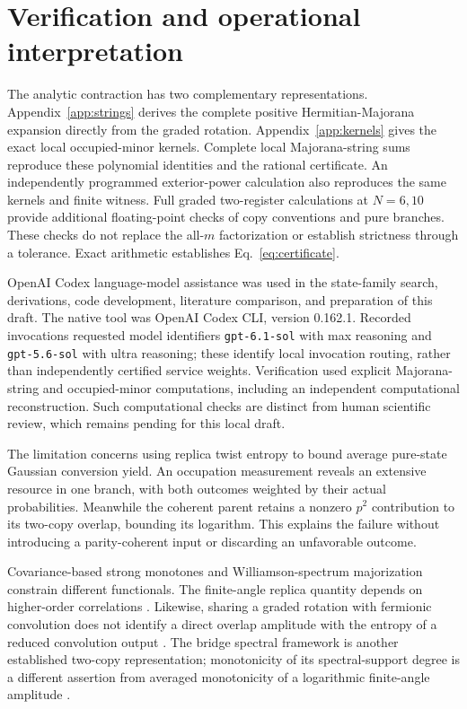 \documentclass[aps,pra,reprint,amsmath,amssymb,longbibliography,floatfix]{revtex4-2}
\begin{document}
\section{Verification and operational interpretation}
\label{sec:discussion}

The analytic contraction has two complementary representations.
Appendix~\ref{app:strings} derives the complete positive
Hermitian-Majorana expansion directly from the graded rotation.
Appendix~\ref{app:kernels} gives the exact local occupied-minor kernels.
Complete local Majorana-string sums reproduce these polynomial
identities and the rational certificate.
An independently programmed exterior-power calculation also
reproduces the same kernels and finite witness. Full graded
two-register calculations at \(N=6,10\) provide additional
floating-point checks of copy conventions and pure branches.
These checks do not replace the all-\(m\) factorization or establish
strictness through a tolerance. Exact arithmetic establishes
Eq.~\eqref{eq:certificate}.

OpenAI Codex language-model assistance was used in the state-family
search, derivations, code development, literature comparison,
and preparation of this draft. The native tool was OpenAI Codex CLI,
version 0.162.1. Recorded invocations requested model identifiers
\texttt{gpt-6.1-sol} with max reasoning and
\texttt{gpt-5.6-sol} with ultra reasoning; these identify local invocation
routing, rather than independently certified service weights.
Verification used explicit Majorana-string and occupied-minor computations,
including an independent computational reconstruction. Such computational checks
are distinct from human scientific review, which remains pending
for this local draft.

The limitation concerns using replica twist entropy to bound
average pure-state Gaussian conversion yield.
An occupation measurement reveals an extensive resource in one branch,
with both outcomes weighted by their actual probabilities.
Meanwhile the coherent parent retains a nonzero \(p^2\) contribution
to its two-copy overlap, bounding its logarithm.
This explains the failure without introducing a parity-coherent
input or discarding an unfavorable outcome.

Covariance-based strong monotones and Williamson-spectrum
majorization \cite{LeoneBittelFermionic2026,Turkeshi2026}
constrain different functionals.
The finite-angle replica quantity depends on higher-order
correlations \cite{SunZhang2026}. Likewise, sharing a graded
rotation with fermionic convolution does not identify a direct
overlap amplitude with the entropy of a reduced convolution
output \cite{LyuBu2024,Coffman2025}.
The bridge spectral framework is another established two-copy
representation; monotonicity of its spectral-support degree
is a different assertion from averaged monotonicity of a
logarithmic finite-angle amplitude \cite{Tarabunga2026}.
\end{document}
